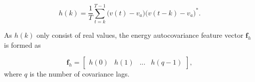 \begin{equation}
	h(k) = \frac{1}{T}\sum_{t=k}^{T-1}\big(v(t) - v_a\big)\big(v(t-k) - v_a\big)^*.
\end{equation}

As $h(k)$ only consist of real values, the energy autocovariance feature vector $\mathbf{f}_{h}$ is formed as

\begin{equation}
	\mathbf{f}_{h} = 
	\begin{bmatrix}
		h(0) & h(1) & ... & h(q-1)
	\end{bmatrix},
\end{equation}
where $q$ is the number of covariance lags. 






